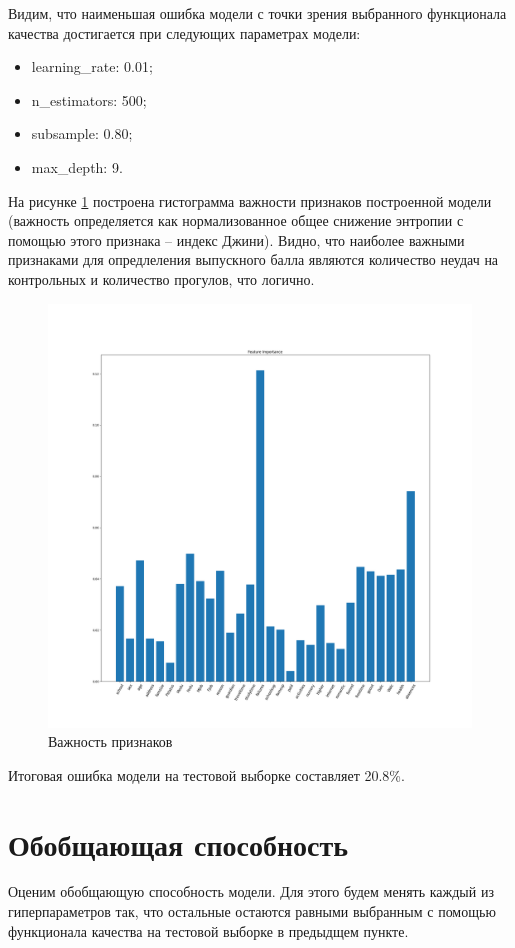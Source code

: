 Видим, что наименьшая ошибка модели с точки зрения выбранного функционала качества достигается при следующих параметрах модели:

\begin{itemize}
    \item learning\_rate: 0.01;
    \item n\_estimators: 500;
    \item subsample: 0.80;
    \item max\_depth: 9.
\end{itemize}

На рисунке \ref{fig:imp} построена гистограмма важности признаков построенной модели (важность определяется как нормализованное общее снижение энтропии с помощью этого признака -- индекс Джини). Видно, что наиболее важными признаками для опредлеления выпускного балла являются количество неудач на контрольных и количество прогулов, что логично.

\begin{figure}[h!]
	\centering
	\includegraphics[scale = 0.3]{img/importancies_GradientBoostingRegressor.png}
	\caption{Важность признаков}
	\label{fig:imp}
\end{figure}

Итоговая ошибка модели на тестовой выборке составляет 20.8\%. 

\section{Обобщающая способность}
Оценим обобщающую способность модели. Для этого будем менять каждый из гиперпараметров так, что остальные остаются равными выбранным с помощью функционала качества на тестовой выборке в предыдщем пункте. 


